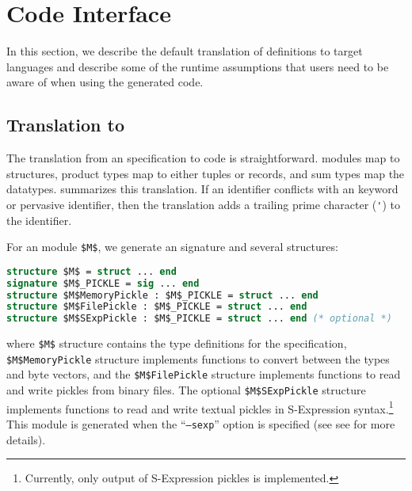%
\chapter{Code Interface}
\label{chap:code-interface}

In this section, we describe the default translation of \asdl{} definitions to target
languages and describe some of the runtime assumptions that users need to be aware of
when using the generated code.

\section{Translation to \sml{}}

The translation from an \asdl{} specification to \sml{} code is straightforward.
\asdl{} modules map to \sml{} structures, \asdl{} product types map to either tuples or records,
and \asdl{} sum types map the \sml{} datatypes.
 summarizes this translation.
If an \asdl{} identifier conflicts with an \sml{} keyword or pervasive identifier, then the translation
adds a trailing prime character (\lstinline[language=SML]!'!) to the identifier.

For an \asdl{} module \lstinline[mathescape=true]@$M$@, we generate an \sml{} signature
and several \sml{} structures:
\begin{code}\begin{lstlisting}[language=SML,mathescape=true]
structure $M$ = struct ... end
signature $M$_PICKLE = sig ... end
structure $M$MemoryPickle : $M$_PICKLE = struct ... end
structure $M$FilePickle : $M$_PICKLE = struct ... end
structure $M$SExpPickle : $M$_PICKLE = struct ... end (* optional *)
\end{lstlisting}\end{code}%
where \lstinline[language=SML,mathescape=true]@$M$@ structure contains the type definitions
for the \asdl{} specification,
\lstinline[language=SML,mathescape=true]@$M$MemoryPickle@ structure
implements functions to convert between the types and byte vectors, and the
\lstinline[language=SML,mathescape=true]@$M$FilePickle@ structure implements functions to
read and write pickles from binary files.
The optional \lstinline[language=SML,mathescape=true]@$M$SExpPickle@ structure implements
functions to  read and write textual pickles in S-Expression syntax.\footnote{
  Currently, only output of S-Expression pickles is implemented.
}
This module is generated when the ``\texttt{--sexp}'' option is specified
(see see  for more details).

